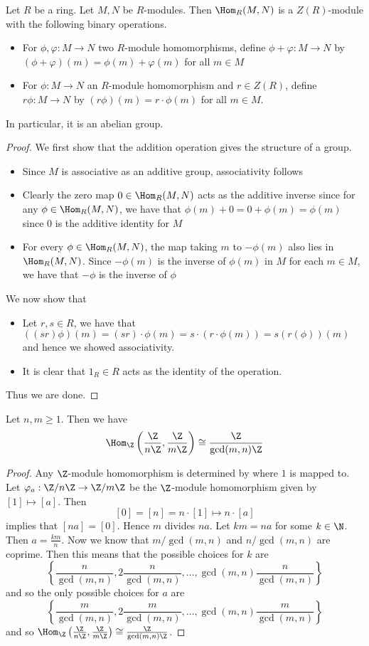 \documentclass[a4paper]{article}
\begin{document}
\begin{prp}{}{} Let $R$ be a ring. Let $M,N$ be $R$-modules. Then $\Hom_R(M,N)$ is a $Z(R)$-module with the following binary operations. 
\begin{itemize}
\item For $\phi,\varphi:M\to N$ two $R$-module homomorphisms, define $\phi+\varphi:M\to N$ by $(\phi+\varphi)(m)=\phi(m)+\varphi(m)$ for all $m\in M$
\item For $\phi:M\to N$ an $R$-module homomorphism and $r\in Z(R)$, define $r\phi:M\to N$ by $(r\phi)(m)=r\cdot\phi(m)$ for all $m\in M$. 
\end{itemize} 
In particular, it is an abelian group. \tcbline
\begin{proof}
We first show that the addition operation gives the structure of a group. 
\begin{itemize}
\item Since $M$ is associative as an additive group, associativity follows
\item Clearly the zero map $0\in\Hom_R(M,N)$ acts as the additive inverse since for any $\phi\in\Hom_R(M,N)$, we have that $\phi(m)+0=0+\phi(m)=\phi(m)$ since $0$ is the additive identity for $M$
\item For every $\phi\in\Hom_R(M,N)$, the map taking $m$ to $-\phi(m)$ also lies in $\Hom_R(M,N)$. Since $-\phi(m)$ is the inverse of $\phi(m)$ in $M$ for each $m\in M$, we have that $-\phi$ is the inverse of $\phi$
\end{itemize}
We now show that 
\begin{itemize}
\item Let $r,s\in R$, we have that $((sr)\phi)(m)=(sr)\cdot\phi(m)=s\cdot(r\cdot\phi(m))=s(r(\phi))(m)$ and hence we showed associativity. 
\item It is clear that $1_R\in R$ acts as the identity of the operation. 
\end{itemize}
Thus we are done. 
\end{proof}
\end{prp}

\begin{eg}{}{} Let $n,m\geq 1$. Then we have $$\Hom_\Z\left(\frac{\Z}{n\Z},\frac{\Z}{m\Z}\right)\cong\frac{\Z}{\gcd(m,n)\Z}$$ \tcbline
\begin{proof}
Any $\Z$-module homomorphism is determined by where $1$ is mapped to. Let $\varphi_a:\Z/n\Z\to\Z/m\Z$ be the $\Z$-module homomorphism given by $[1]\mapsto[a]$. Then $$[0]=[n]=n\cdot[1]\mapsto n\cdot[a]$$ implies that $[na]=[0]$. Hence $m$ divides $na$. Let $km=na$ for some $k\in\N$. Then $a=\frac{km}{n}$. Now we know that $m/\gcd(m,n)$ and $n/\gcd(m,n)$ are coprime. Then this means that the possible choices for $k$ are $$\left\{\frac{n}{\gcd(m,n)},2\frac{n}{\gcd(m,n)},\dots,\gcd(m,n)\frac{n}{\gcd(m,n)}\right\}$$ and so the only possible choices for $a$ are $$\left\{\frac{m}{\gcd(m,n)},2\frac{m}{\gcd(m,n)},\dots,\gcd(m,n)\frac{m}{\gcd(m,n)}\right\}$$ and so $\Hom_\Z\left(\frac{\Z}{n\Z},\frac{\Z}{m\Z}\right)\cong\frac{\Z}{\gcd(m,n)\Z}$. 
\end{proof}
\end{eg}
\end{document}
